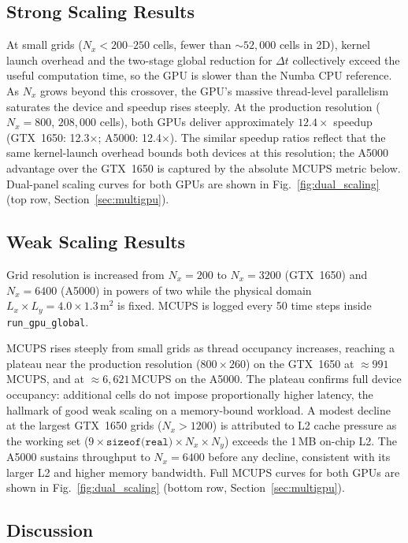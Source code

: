 \documentclass[10pt, conference]{FMFP2023}
\begin{document}
\subsection{Strong Scaling Results}

At small grids ($N_x<200$--$250$ cells, fewer than
$\sim52{,}000$ cells in 2D), kernel launch overhead and
the two-stage global reduction for $\Delta t$ collectively
exceed the useful computation time, so the GPU is slower
than the Numba CPU reference.
As $N_x$ grows beyond this crossover, the GPU's massive
thread-level parallelism saturates the device and speedup
rises steeply.
At the production resolution ($N_x=800$, $208{,}000$
cells), both GPUs deliver approximately $12.4\times$
speedup (GTX~1650: 12.3$\times$; A5000: 12.4$\times$).
The similar speedup ratios reflect that the same
kernel-launch overhead bounds both devices at this
resolution; the A5000 advantage over the GTX~1650 is
captured by the absolute MCUPS metric below.
Dual-panel scaling curves for both GPUs are shown in
Fig.~\ref{fig:dual_scaling} (top row, Section~\ref{sec:multigpu}).

\subsection{Weak Scaling Results}

Grid resolution is increased from $N_x=200$ to
$N_x=3200$ (GTX~1650) and $N_x=6400$ (A5000) in
powers of two while the physical domain
$L_x\times L_y=4.0\times1.3$\,m$^2$ is fixed.
MCUPS is logged every 50 time steps inside
\texttt{run\_gpu\_global}.

MCUPS rises steeply from small grids as thread occupancy
increases, reaching a plateau near the production
resolution ($800\times260$) on the GTX~1650 at
$\approx991$\,MCUPS, and at $\approx6{,}621$\,MCUPS on
the A5000.
The plateau confirms full device occupancy: additional
cells do not impose proportionally higher latency, the
hallmark of good weak scaling on a memory-bound workload.
A modest decline at the largest GTX~1650 grids
($N_x>1200$) is attributed to L2 cache pressure as the
working set
($9\times\texttt{sizeof(real)}\times N_x\times N_y$)
exceeds the 1\,MB on-chip L2.
The A5000 sustains throughput to $N_x=6400$ before any
decline, consistent with its larger L2 and higher
memory bandwidth.
Full MCUPS curves for both GPUs are shown in
Fig.~\ref{fig:dual_scaling} (bottom row,
Section~\ref{sec:multigpu}).

\subsection{Discussion}
\end{document}
